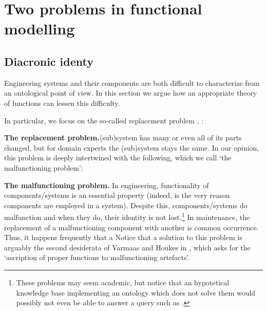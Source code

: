 \documentclass[
]{ceurart}
\begin{document}
\section{Two problems in functional modelling}

\subsection{Diacronic identy}\label{subsec:identity}
Engineering systems and their components are both difficult to characterize from an ontological point of view. %
In this section we argue how an appropriate theory of functions can lessen this difficulty.%

In particular, we focus on the so-called replacement problem \cite{guarinoArtefactualSystemsMissing2014},  \cite[Chapter 14]{westDevelopingHighQuality2011}:
\bflist
\item[\mypb{replacement}] \textbf{The replacement problem.}(sub)system has many or even all of its parts changed, but for domain experts the (sub)system stays the same. 
\eflist
In our opinion, this problem is deeply intertwined with the following, which we call `the malfunctioning problem':
\bflist
\item[\mypb{malfunctioning}] \textbf{The malfunctioning problem.} In engineering, functionality of components/systems is an essential property (indeed, is the very reason components are employed in a system). Despite this, components/systems do malfunction and when they do, their identity is not lost.\footnote{These problems may seem academic, but notice that an hypotetical knowledge base implementing an ontology which does not solve them would possibly not even be able to answer a query such as .} 
\eflist In maintenance, the replacement of a malfunctioning component with another is common occurrence. Thus, it happens frequently that a 
Notice that a solution to this problem is arguably the second desiderata of Varmaas and Houkes in \cite{vermaasAscribingFunctionsTechnical2003}, which asks for the `ascription of proper functions to malfunctioning artefacts'.
\end{document}
